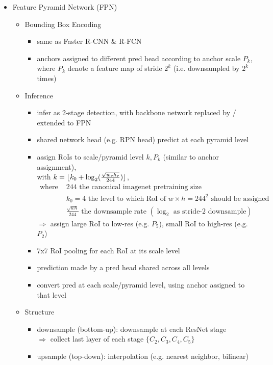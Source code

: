 \begin{itemize}
\item Feature Pyramid Network (FPN)
	\begin{itemize}
	\item Bounding Box Encoding
		\begin{itemize}
		\item same as Faster R-CNN \& R-FCN
		\item anchors assigned to different pred head according to anchor scale $P_k$, \\
		where $P_k$ denote a feature map of stride $2^k$ (i.e. downsampled by $2^k$ times)
		\end{itemize}
	\item Inference
		\begin{itemize}
		\item infer as 2-stage detection, with backbone network replaced by / extended to FPN 
		\item shared network head (e.g. RPN head) predict at each pyramid level
		\item assign RoIs to scale/pyramid level $k, P_k$ (similar to anchor assignment), \\
		with $k = \lfloor k_0 + \log_2(\frac {\sqrt{w_rh_r}} {244})\rfloor$,
		\begin{align*}
		\text{where } & 244 \text{ the canonical imagenet pretraining size} \\
		& k_0=4 \text{ the level to which RoI of } w\times h=244^2 \text{ should be assigned} \\
		& \frac {\sqrt{wh}}{244} \text{ the downsample rate } (\log_2\text{ as stride-2 downsample})
		\end{align*}
		$\Rightarrow$ assign large RoI to low-res (e.g. $P_5$), small RoI to high-res (e.g. $P_2$)
		\item 7x7 RoI pooling for each RoI at its scale level
		\item prediction made by a pred head shared across all levels
		\item convert pred at each scale/pyramid level, using anchor assigned to that level
		\end{itemize}
	\item Structure
		\begin{itemize}
		\item downsample (bottom-up): downsample at each ResNet stage \\
		$\Rightarrow$ collect last layer of each stage $\{C_2,C_3,C_4,C_5\}$
		\item upsample (top-down): interpolation (e.g. nearest neighbor, bilinear) \\

\end{itemize}
\end{itemize}
\end{itemize}
